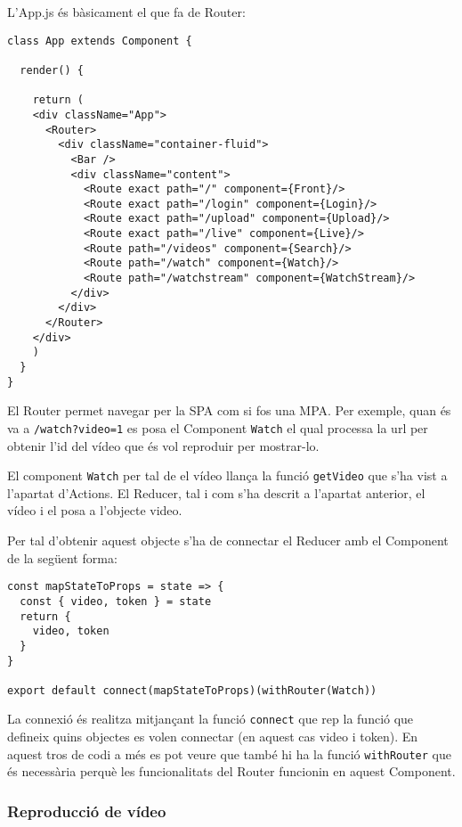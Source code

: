 \documentclass[12pt, titlepage]{article}
\begin{document}
L'App.js és bàsicament el que fa de Router:
\begin{lstlisting}[breaklines]
class App extends Component {

  render() {

    return (
    <div className="App">
      <Router>
        <div className="container-fluid">
          <Bar />
          <div className="content">
            <Route exact path="/" component={Front}/>
            <Route exact path="/login" component={Login}/>
            <Route exact path="/upload" component={Upload}/>
            <Route exact path="/live" component={Live}/>
            <Route path="/videos" component={Search}/>
            <Route path="/watch" component={Watch}/>
            <Route path="/watchstream" component={WatchStream}/>
          </div>
        </div>
      </Router>
    </div>
    )
  }
}
\end{lstlisting}

El Router permet navegar per la SPA com si fos una MPA. Per exemple, quan és va
a \verb|/watch?video=1| es posa el Component \verb|Watch| el qual processa la url
per obtenir l'id del vídeo que és vol reproduir per mostrar-lo.

El component \verb|Watch| per tal de  el vídeo llança la funció \verb|getVideo| que s'ha
vist a l'apartat d'Actions. El Reducer, tal i com s'ha descrit a l'apartat anterior,
 el vídeo i el posa a l'objecte video.

Per tal d'obtenir aquest objecte s'ha de connectar el Reducer amb el Component
de la següent forma:

\begin{lstlisting}
const mapStateToProps = state => {
  const { video, token } = state
  return {
    video, token
  }
}

export default connect(mapStateToProps)(withRouter(Watch))
\end{lstlisting}

La connexió és realitza mitjançant la funció \verb|connect| que rep la funció que
defineix quins objectes es volen connectar (en aquest cas video i token).
En aquest tros de codi a més es pot veure que també hi ha la funció \verb|withRouter|
que és necessària perquè les funcionalitats del Router funcionin en aquest Component.

\subsubsection{Reproducció de vídeo}
\end{document}
